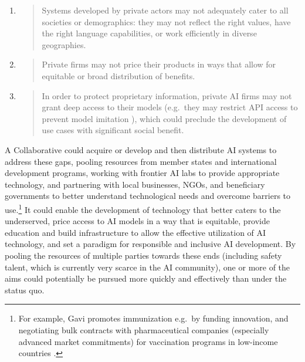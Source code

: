 \documentclass[12pt]{article}
\begin{document}
\begin{enumerate}
\def\labelenumi{\arabic{enumi}.}
\item
  \begin{quote}
  Systems developed by private actors may not adequately cater to all
  societies or demographics: they may not reflect the right values, have
  the right language capabilities, or work efficiently in diverse
  geographies\cite{mohamed_decolonial_2020}.
  \end{quote}
\item
  \begin{quote}
  Private firms may not price their products in ways that allow for
  equitable or broad distribution of benefits.
  \end{quote}
\item
  \begin{quote}
  In order to protect proprietary information, private AI firms may not
  grant deep access to their models (e.g.\ they may restrict API access
  to prevent model imitation \cite{taori_alpaca_2023}),
  which could preclude the development of use cases with significant
  social benefit.
  \end{quote}
\end{enumerate}

A Collaborative could acquire or develop and then distribute AI systems
to address these gaps, pooling resources from member states and
international development programs, working with frontier AI labs to
provide appropriate technology, and partnering with local businesses,
NGOs, and beneficiary governments to better understand technological
needs and overcome barriers to use.\footnote{For example, Gavi promotes
  immunization e.g.\ by funding innovation, and negotiating bulk contracts with
  pharmaceutical companies (especially advanced market commitments) for
  vaccination programs in low-income countries \cite{noauthor_what_2020}.}
It could enable the development of technology that better caters to the
underserved, \cite{mohamed_decolonial_2020} price access to AI models in
a way that is equitable, provide education and build infrastructure to
allow the effective utilization of AI technology, and set a paradigm for
responsible and inclusive AI development. By pooling the resources of
multiple parties towards these ends (including safety talent, which is
currently very scarce in the AI community), one or more of the aims
could potentially be pursued more quickly and effectively than under the
status quo.
\end{document}
